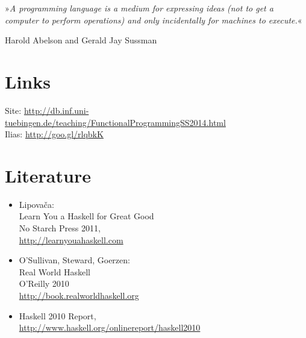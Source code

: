 \documentclass[12pt,a4paper]{article}
\begin{document}
\newpage

\vspace*{\fill}
»\textit{A programming language is a medium for expressing ideas (not to get a computer to perform operations) and only incidentally for machines to execute.}«\\
\begin{flushright}
    Harold Abelson and Gerald Jay Sussman
\end{flushright}
\vspace*{\fill}

\newpage


\section*{Links}

Site: \url{http://db.inf.uni-tuebingen.de/teaching/FunctionalProgrammingSS2014.html}\\
Ilias: \url{http://goo.gl/rlqbkK}


\section*{Literature}

\begin{itemize}
    \item Lipovača: \\ Learn You a Haskell for Great Good \\ No Starch Press 2011, \\ \url{http://learnyouahaskell.com}
    \item O'Sullivan, Steward, Goerzen: \\ Real World Haskell \\ O'Reilly 2010 \\ \url{http://book.realworldhaskell.org}
    \item Haskell 2010 Report, \\ \url{http://www.haskell.org/onlinereport/haskell2010}
\end{itemize}


\pagebreak


\pagebreak
\newcommand{\codeline}[1]{\texttt{#1}}

%
% 
%
% 
%
% 
%
% 
%
% 
\end{document}
